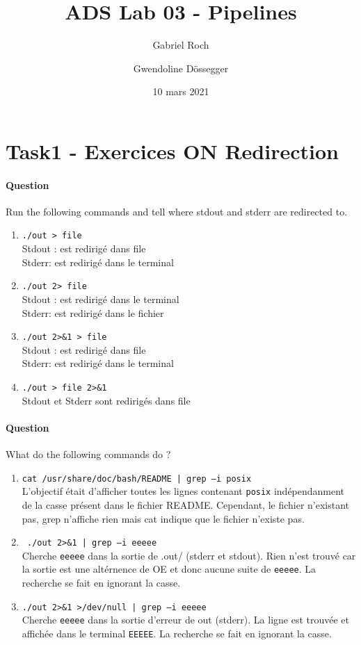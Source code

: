 \documentclass[a4paper,11pt]{article}
\title{ADS Lab 03 - Pipelines}
\date{10 mars 2021}
\author{Gabriel Roch \and Gwendoline Dössegger}
\newcounter{commande}[subsection]
\newcommand{\question}[1]{\addtocounter{commande}{1}\paragraph{Question \arabic{commande}}#1\;}
\begin{document}
\maketitle
\section{Task1 - Exercices ON Redirection}
\question{Run the following commands and tell where stdout and stderr are redirected to.}
\begin{enumerate}
  \item \texttt{./out > file}       \\ Stdout : est redirigé dans file \\Stderr: est redirigé dans le terminal
  \item \texttt{./out 2> file}      \\ Stdout : est redirigé dans le terminal \\Stderr: est redirigé dans le fichier
  \item \texttt{./out 2>\&1 > file} \\ Stdout : est redirigé dans file\\Stderr: est redirigé dans le terminal
  \item \texttt{./out > file 2>\&1} \\ Stdout et Stderr sont redirigés dans file
\end{enumerate}

  
\question{What do the following commands do ?}
\begin{enumerate}
  \item \texttt{cat /usr/share/doc/bash/README | grep –i posix} \\L'objectif était d'afficher toutes les lignes contenant \texttt{posix} indépendanment de la casse présent dans le fichier README. Cependant, le fichier n'existant pas, grep n'affiche rien mais cat indique que le fichier n'existe pas.
  \item \texttt{ ./out 2>\&1 | grep –i eeeee} \\Cherche \texttt{eeeee} dans la sortie de .out/ (stderr et stdout). Rien n'est trouvé car la sortie est une altérnence de OE et donc aucune suite de \texttt{eeeee}. La recherche se fait en ignorant la casse.
  \item \texttt{./out 2>\&1 >/dev/null | grep –i eeeee} \\Cherche \texttt{eeeee} dans la sortie d'erreur de out (stderr). La ligne est trouvée et affichée dans le terminal \texttt{EEEEE}. La recherche se fait en ignorant la casse.
\end{enumerate}
\end{document}
